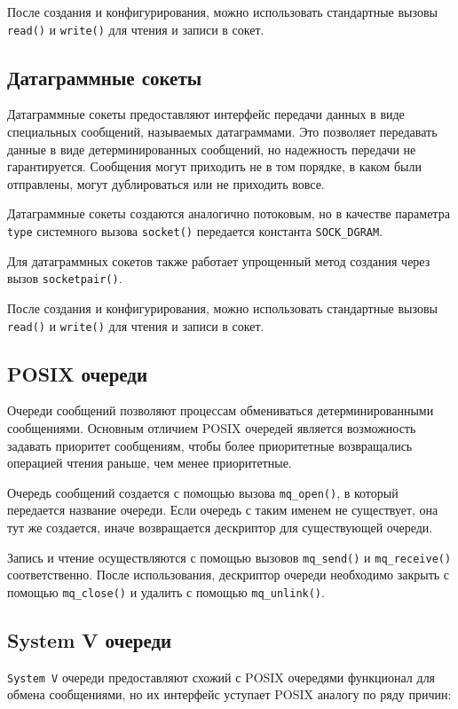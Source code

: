 \documentclass[14pt, russian]{scrartcl}
\begin{document}
После создания и конфигурирования, можно использовать стандартные вызовы
\verb|read()| и \verb|write()| для чтения и записи в сокет.

\subsection{Датаграммные сокеты}

Датаграммные сокеты предоставляют интерфейс передачи данных в виде специальных
сообщений, называемых датаграммами. Это позволяет передавать данные в виде
детерминированных сообщений, но надежность передачи не гарантируется. Сообщения
могут приходить не в том порядке, в каком были отправлены, могут дублироваться
или не приходить вовсе.

Датаграммные сокеты создаются аналогично потоковым, но в качестве параметра
\verb|type| системного вызова \verb|socket()| передается константа
\verb|SOCK_DGRAM|.

Для датаграммных сокетов также работает упрощенный метод создания через вызов
\verb|socketpair()|.

После создания и конфигурирования, можно использовать стандартные вызовы
\verb|read()| и \verb|write()| для чтения и записи в сокет.

\subsection{POSIX очереди}

Очереди сообщений позволяют процессам обмениваться детерминированными
сообщениями. Основным отличием POSIX очередей является возможность задавать
приоритет сообщениям, чтобы более приоритетные возвращались операцией чтения
раньше, чем менее приоритетные.

Очередь сообщений создается с помощью вызова \verb|mq_open()|, в который
передается название очереди. Если очередь с таким именем не существует, она тут
же создается, иначе возвращается дескриптор для существующей очереди.

Запись и чтение осуществляются с помощью вызовов \verb|mq_send()| и
\verb|mq_receive()| соответственно. После использования, дескриптор очереди
необходимо закрыть с помощью \verb|mq_close()| и удалить с помощью
\verb|mq_unlink()|.

\subsection{System V очереди}

\verb|System V| очереди предоставляют схожий с POSIX очередями функционал для
обмена сообщениями, но их интерфейс уступает POSIX аналогу по ряду причин:
\end{document}
